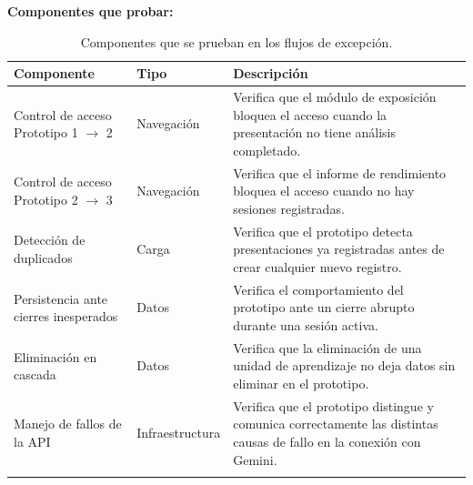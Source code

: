 \documentclass[11pt]{article}
\begin{document}
\textbf{Componentes que probar:}
{\tiny
\renewcommand{\arraystretch}{1.2}
\begin{longtable}{|L{4.3cm}|L{2.0cm}|L{8.6cm}|}
\hline
\textbf{Componente} & \textbf{Tipo} & \textbf{Descripción} \\
\hline
\endhead
Control de acceso Prototipo 1 $\rightarrow$ 2 & Navegación & Verifica que el módulo de exposición bloquea el acceso cuando la presentación no tiene análisis completado. \\
\hline
Control de acceso Prototipo 2 $\rightarrow$ 3 & Navegación & Verifica que el informe de rendimiento bloquea el acceso cuando no hay sesiones registradas. \\
\hline
Detección de duplicados & Carga & Verifica que el prototipo detecta presentaciones ya registradas antes de crear cualquier nuevo registro. \\
\hline
Persistencia ante cierres inesperados & Datos & Verifica el comportamiento del prototipo ante un cierre abrupto durante una sesión activa. \\
\hline
Eliminación en cascada & Datos & Verifica que la eliminación de una unidad de aprendizaje no deja datos sin eliminar en el prototipo. \\
\hline
Manejo de fallos de la API & Infraestructura & Verifica que el prototipo distingue y comunica correctamente las distintas causas de fallo en la conexión con Gemini. \\
\hline
\caption{Componentes que se prueban en los flujos de excepción.}
\label{tab:componentes-flujos-excepcion}
\end{longtable}
}
\end{document}
